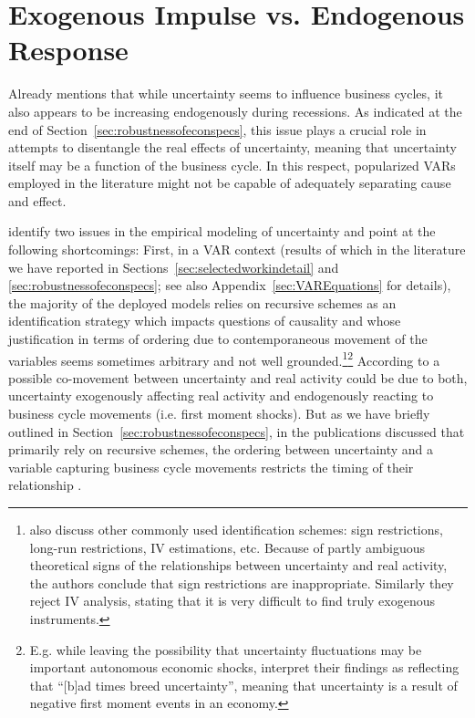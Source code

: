 \documentclass[a4paper,11pt,listof=nochaptergap,oneside,pointednumbers,bibtotoc,bigheadings,liststotoc,hidelinks]{scrbook}
\theoremstyle{mysatz}
\theoremstyle{mydefinition}
\theoremstyle{mytheorem}
\theoremstyle{mybemerkung}
\begin{document}
\section{Exogenous Impulse vs. Endogenous Response}
\label{sec:exoEndoJuradoetal}
Already \citet{bloom:14} mentions that while uncertainty seems to influence business cycles, it also appears to be increasing endogenously during recessions. As indicated at the end of Section~\ref{sec:robustnessofeconspecs}, this issue plays a crucial role in attempts to disentangle the real effects of uncertainty, meaning that uncertainty itself may be a function of the business cycle. In this respect, popularized VARs employed in the literature might not be capable of adequately separating cause and effect.

 \citet{ludvigsonetal:19} identify two issues in the empirical modeling of uncertainty and point at the following shortcomings: First, in a VAR context (results of which in the literature we have reported in Sections~\ref{sec:selectedworkindetail} and \ref{sec:robustnessofeconspecs}; see also Appendix~\ref{sec:VAREquations} for details), the majority of the deployed models relies on recursive schemes as an identification strategy which impacts questions of causality and whose justification in terms of ordering due to contemporaneous movement of the variables seems sometimes arbitrary and not well grounded.\footnote{\citet{ludvigsonetal:19} also discuss other commonly used identification schemes: sign restrictions, long-run restrictions, IV estimations, etc. Because of partly ambiguous theoretical signs of the relationships between uncertainty and real activity, the authors conclude that sign restrictions are inappropriate. Similarly they reject IV analysis, stating that it is very difficult to find truly exogenous instruments.}\footnote{E.g. while leaving the possibility that uncertainty fluctuations may be important autonomous economic shocks, \citet[p. 28]{bachmannetal:13} interpret their findings as reflecting that ``[b]ad times breed uncertainty'', meaning that uncertainty is a result of negative first moment events in an economy.} According to \citet{ludvigsonetal:19} a possible co-movement between uncertainty and real activity could be due to both, uncertainty exogenously affecting real activity and endogenously reacting to business cycle movements (i.e. first moment shocks). But as we have briefly outlined in Section~\ref{sec:robustnessofeconspecs}, in the publications discussed that primarily rely on recursive schemes, the ordering between uncertainty and a variable capturing business cycle movements restricts the timing of their relationship \citep{ludvigsonetal:19}.
 
\end{document}
